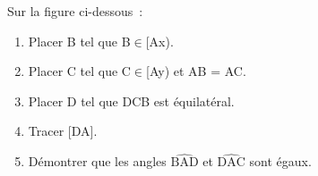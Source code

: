 \documentclass[exercice]{thedocument}%
\begin{document}
%
Sur la figure ci-dessous~:
\begin{enumerate}
    \item Placer B tel que B$\in$[Ax).
    \item Placer C tel que C$\in$[Ay) et AB = AC.
    \item Placer D tel que DCB est équilatéral.
    \item Tracer [DA].
    \item Démontrer que les angles $\widehat{\text{BAD}}$ et $\widehat{\text{DAC}}$
    sont égaux.
\end{enumerate}
\begin{center}
\end{center}
\end{document}
